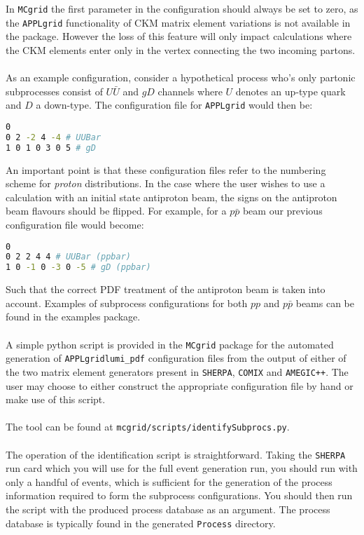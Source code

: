 \documentclass[11pt]{article}
\newcommand{\mcgrid} {{\tt MCgrid}\xspace}
\newcommand{\appl} {{\tt APPLgrid}\xspace}
\newcommand{\sherpa} {{\tt SHERPA}\xspace}
\begin{document}
In \mcgrid the first parameter in the configuration should always be set to zero, as the \appl functionality of CKM matrix element variations is not available in the package. However the loss of this feature will only impact calculations where the CKM elements enter only in the vertex connecting the two incoming partons.  \\\\
As an example configuration, consider a hypothetical process who's only partonic subprocesses consist of $U\bar{U}$ and $gD$ channels where $U$ denotes an up-type quark and $D$ a down-type. The configuration file for \appl would then be:
\begin{lstlisting}[language=bash]
0 
0 2 -2 4 -4 # UUBar
1 0 1 0 3 0 5 # gD
\end{lstlisting}
An important point is that these configuration files refer to the numbering scheme for \emph{proton} distributions. In the case where the user wishes to use a calculation with an initial state antiproton beam, the signs on the antiproton beam flavours should be flipped. For example, for a $p\bar{p}$ beam our previous configuration file would become:
\begin{lstlisting}[language=bash]
0
0 2 2 4 4 # UUBar (ppbar)
1 0 -1 0 -3 0 -5 # gD (ppbar)
\end{lstlisting}
Such that the correct PDF treatment of the antiproton beam is taken into account. Examples of subprocess configurations for both $pp$ and $p\bar{p}$ beams can be found in the examples package.\\\\
A simple python script is provided in the \mcgrid package for the automated generation of \appl \lstinline[language=c++]{lumi_pdf} configuration files from the output of either of the two matrix element generators present in \sherpa, {\tt COMIX}\cite{Gleisberg:2008fv} and {\tt AMEGIC++}\cite{Krauss:2001iv}. The user may choose to either construct the appropriate configuration file by hand or make use of this script.\\\\
The tool can be found at \lstinline[language=bash]{mcgrid/scripts/identifySubprocs.py}. 
\\\\
The operation of the identification script is straightforward. Taking the \sherpa run card which you will use for the full event generation run, you should run with only a handful of events, which is sufficient for the generation of the process information required to form the subprocess configurations. You should then run the script with the produced process database as an argument. The process database is typically found in the generated \lstinline[language=bash]{Process} directory.
\end{document}
